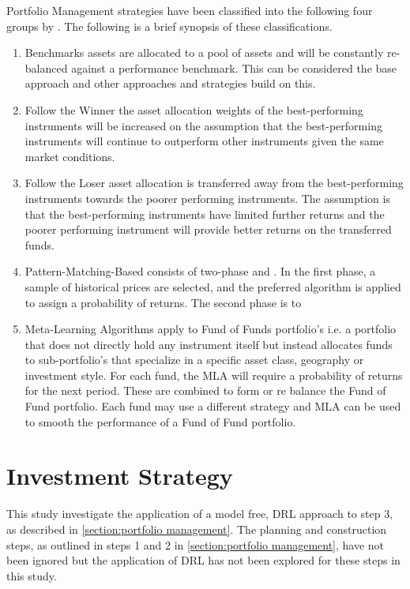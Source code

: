 \documentclass[oneside,12pt]{Classes/RoboticsLaTeX}
\begin{document}
Portfolio Management strategies have been classified into the following four groups by \citet{LiBin2014OpsA} .  The following is a brief synopsis of these classifications.
\begin{enumerate}
\item Benchmarks \citep[7-9]{LiBin2014OpsA} assets are allocated to a pool of assets and will be constantly re-balanced against a performance benchmark. This can be considered the base approach and other approaches and strategies build on this.
\item Follow the Winner \citep[9-15]{LiBin2014OpsA}the asset allocation weights of the best-performing instruments will be increased on the assumption that the best-performing instruments will continue to outperform other instruments given the same market conditions.
\item Follow the Loser \citep[15-19]{LiBin2014OpsA} asset allocation is transferred away from the best-performing instruments towards the poorer performing instruments. The assumption is that the best-performing instruments have limited further returns and the poorer performing instrument will provide better returns on the transferred funds.
\item Pattern-Matching-Based \citep[19-22]{LiBin2014OpsA} consists of two-phase  and . In the first phase, a sample of historical prices are selected, and the preferred algorithm is applied to assign a probability of returns.  The second phase is to 
\item Meta-Learning Algorithms \citep[22-24]{LiBin2014OpsA} apply to Fund of Funds portfolio’s i.e. a  portfolio that does not directly hold any instrument itself but instead allocates funds to sub-portfolio's that specialize in a specific asset class, geography or investment style. For each fund, the MLA will require a probability of returns for the next period.  These are combined to form or re balance the Fund of Fund portfolio. Each fund may use a different strategy and MLA can be used to smooth the performance of a Fund of Fund portfolio.
\end{enumerate}
\newpage
\section{Investment Strategy}
This study investigate the application of a model free, DRL approach to step 3,  as described in \ref{section:portfolio management}.  The planning and construction steps, as outlined in steps 1 and 2 in \ref{section:portfolio management}, have not been ignored but the application of DRL has not been explored for these steps in this study.
\end{document}
